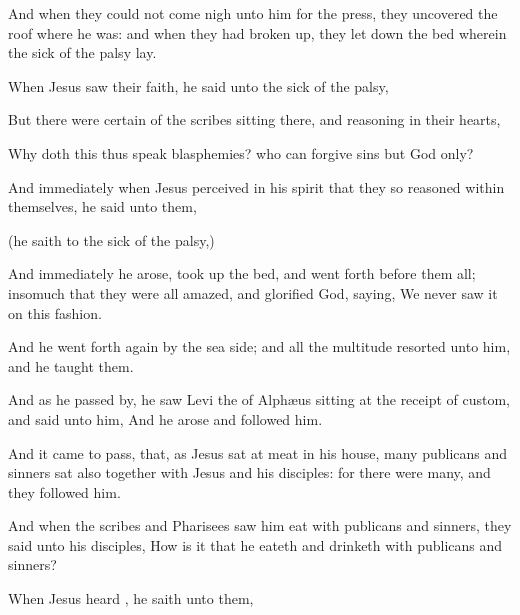 {And when they
could
not come nigh
unto
him
for the
press, they
uncovered the
roof
where he
was:
and when they had
broken
{}
up, they let
down the
bed
wherein the sick of the
palsy
lay.

When
Jesus
saw
their
faith, he
said unto the sick of the
palsy,
{}

But there
were
certain of the
scribes
sitting
there,
and
reasoning
in
their
hearts,

Why
doth
this
{}
thus
speak
blasphemies?
who
can
forgive
sins
but
God
only?

And
immediately
when
Jesus
perceived
in
his
spirit
that
they
so
reasoned
within
themselves, he
said unto
them,
{}


 (he
saith to the sick of the
palsy,)


And
immediately he
arose, took
up the
bed,
and went
forth
before them
all; insomuch
that they were
all
amazed,
and
glorified
God,
saying,
We
never
saw it on this
fashion.

And he went
forth
again
by the sea
side;
and
all the
multitude
resorted
unto
him,
and he
taught
them.

And as he passed
by, he
saw
Levi
the
{} of
Alphæus
sitting
at the receipt of
custom,
and
said unto
him,
{}
And
he arose
and
followed
him.

And it came to
pass, that,
as
Jesus sat at
meat
in
his
house,
many
publicans
and
sinners
sat
also
together with
Jesus
and
his
disciples:
for there
were
many,
and they
followed
him.

And when the
scribes
and
Pharisees
saw
him
eat
with
publicans
and
sinners, they
said
unto
his
disciples, How is
it
that he
eateth
and
drinketh
with
publicans
and
sinners?

When
Jesus
heard
{}, he
saith unto
them,
{}

}
